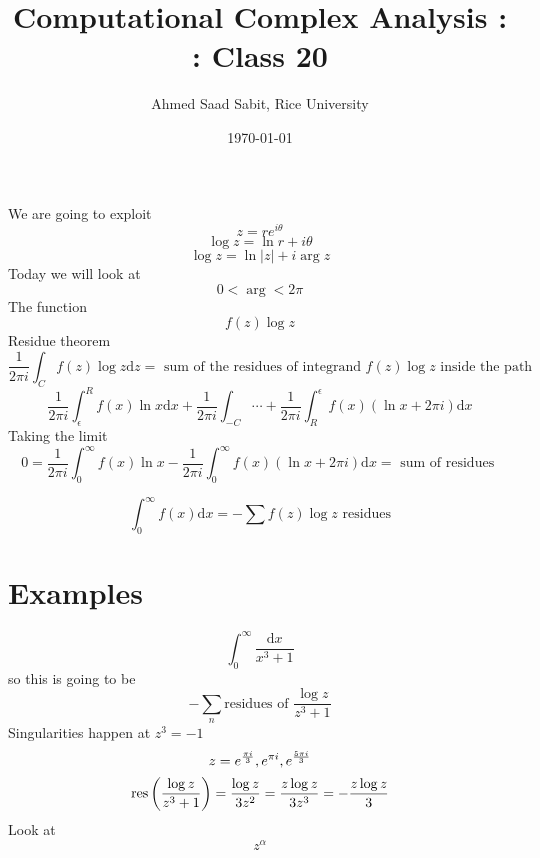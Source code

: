 \documentclass[letter]{article}
\title{Computational Complex Analysis : : Class 20}
\author{Ahmed Saad Sabit, Rice University}
\date{\today}
\begin{document}
\maketitle

We are going to exploit 
\[
z = r e^{i \theta}
\]
\[
\log z = \ln r + i \theta
\] 
\[
\log z = \ln |z| + i \arg z
\]
Today we will look at 
\[
0 < \arg < 2 \pi 
\] 
The function 
\[
f(z) \log z
\]
Residue theorem 
\[\frac{1}{2\pi i }
\int_C f(z) \log z \mathrm{d} z = \text{ sum of the residues of integrand }f(z)\log z \text{ inside the path }
\]
\[
	\frac{1}{2 \pi i } \int_\epsilon^R f(x) \ln x \mathrm{d} x +
	\frac{1}{2 \pi i}\int_{-C} \cdots + 
	\frac{1}{2\pi i } \int_R^{\epsilon} f(x) (\ln x + 2 \pi i ) \mathrm{d}  x
\]
Taking the limit 
\[
0 = \frac{1}{2 \pi i } \int_0^{\infty} f(x) \ln x - \frac{1}{2 \pi i } \int_0^\infty f(x) 
\left(\ln x + 2 \pi i \right)\mathrm{d} x = \text{ sum of residues }
\]

\[
\boxed{
\int_0^{\infty} f(x) \mathrm{d} x = - \sum_{}^{} f(z) \log z \text{ residues}
}
\]

\section*{Examples}
\[
\int_0^{\infty} \frac{\mathrm{d} x}{ x^3+1}
\] 
so this is going to be 
\[
- \sum_{n}^{} \text{residues of } \frac{\log z}{z^3+1}
\] 
Singularities happen at $z^3 = -1$ 
\[
z = e^{ \pi i \over 3}, e^{ \pi i }, e^{5 \pi i \over 3}
\]
\[
\text{res}\left({\log z \over z^3+1 } \right) = \frac{\log z}{3 z^2} = {z \log z \over 3 z^3} = - {z \log z \over 3}
\] 
Look at 
\[
z^{\alpha}
\] 
\end{document}
